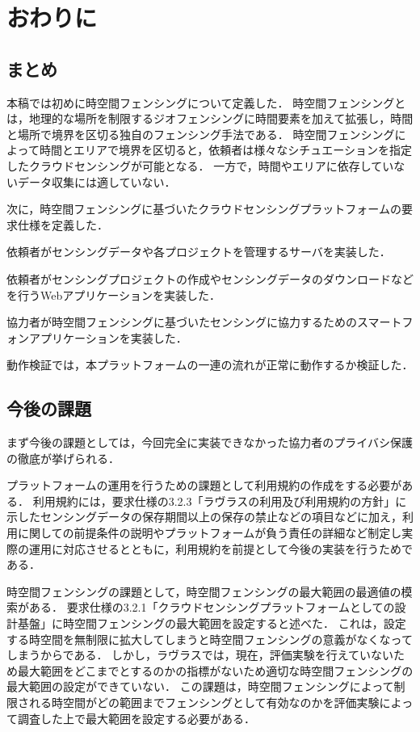\chapter{おわりに}
\thispagestyle{myheadings}

\section{まとめ}
本稿では初めに時空間フェンシングについて定義した．
時空間フェンシングとは，地理的な場所を制限するジオフェンシングに時間要素を加えて拡張し，時間と場所で境界を区切る独自のフェンシング手法である．
時空間フェンシングによって時間とエリアで境界を区切ると，依頼者は様々なシチュエーションを指定したクラウドセンシングが可能となる．
一方で，時間やエリアに依存していないデータ収集には適していない．

次に，時空間フェンシングに基づいたクラウドセンシングプラットフォームの要求仕様を定義した．

依頼者がセンシングデータや各プロジェクトを管理するサーバを実装した．

依頼者がセンシングプロジェクトの作成やセンシングデータのダウンロードなどを行うWebアプリケーションを実装した．

協力者が時空間フェンシングに基づいたセンシングに協力するためのスマートフォンアプリケーションを実装した．

動作検証では，本プラットフォームの一連の流れが正常に動作するか検証した．
\section{今後の課題}
まず今後の課題としては，今回完全に実装できなかった協力者のプライバシ保護の徹底が挙げられる．

プラットフォームの運用を行うための課題として利用規約の作成をする必要がある．
利用規約には，要求仕様の3.2.3「ラヴラスの利用及び利用規約の方針」に示したセンシングデータの保存期間以上の保存の禁止などの項目などに加え，利用に関しての前提条件の説明やプラットフォームが負う責任の詳細など制定し実際の運用に対応させるとともに，利用規約を前提として今後の実装を行うためである．

時空間フェンシングの課題として，時空間フェンシングの最大範囲の最適値の模索がある．
要求仕様の3.2.1「クラウドセンシングプラットフォームとしての設計基盤」に時空間フェンシングの最大範囲を設定すると述べた．
これは，設定する時空間を無制限に拡大してしまうと時空間フェンシングの意義がなくなってしまうからである．
しかし，ラヴラスでは，現在，評価実験を行えていないため最大範囲をどこまでとするのかの指標がないため適切な時空間フェンシングの最大範囲の設定ができていない．
この課題は，時空間フェンシングによって制限される時空間がどの範囲までフェンシングとして有効なのかを評価実験によって調査した上で最大範囲を設定する必要がある．

